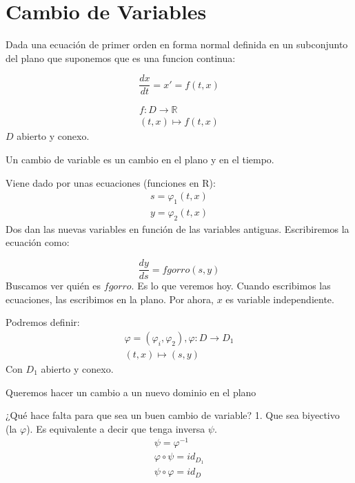 \newpage
\chapter{Cambio de Variables}

Dada una ecuación de primer orden en forma normal definida en un subconjunto del plano que suponemos que es una funcion continua:

\begin{equation*}
    \dfrac{dx}{dt} = x' = f(t,x)
\end{equation*}

\begin{gather*}
    f:D\rightarrow\mathbb{R}\\
    (t,x)\mapsto f(t,x)
\end{gather*}
$D$ abierto y conexo.

Un cambio de variable es un cambio en el plano y en el tiempo.

Viene dado por unas ecuaciones (funciones en R):
\begin{gather*}
    s=\varphi_1(t,x) \\
    y = \varphi_2(t,x)
\end{gather*}
Dos dan las nuevas variables en función de las variables antiguas.
Escribiremos la ecuación como:

\begin{equation*}
    \dfrac{dy}{ds} = fgorro(s,y)
\end{equation*}
Buscamos ver quién es $fgorro$. Es lo que veremos hoy.
Cuando escribimos las ecuaciones, las escribimos en la plano.
Por ahora, $x$ es variable independiente.

Podremos definir:
\begin{gather*}
    \varphi = (\varphi_i, \varphi_2), \varphi:D\rightarrow D_1 \\
    (t,x) \mapsto (s,y)
\end{gather*}
Con $D_1$ abierto y conexo.

Queremos hacer un cambio a un nuevo dominio en el plano


¿Qué hace falta para que sea un buen cambio de variable?
1. Que sea biyectivo (la $\varphi$). Es equivalente a decir que tenga inversa $\psi$.
\begin{gather*}
    \psi = \varphi^{-1} \\
    \varphi \circ \psi = id_{D_1} \\
    \psi \circ \varphi = id_{D} \\
\end{gather*}

